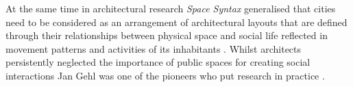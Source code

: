 
At the same time in architectural research \textit{Space Syntax} generalised that cities need to be considered as an arrangement of architectural layouts that are defined through their relationships between physical space and social life reflected in movement patterns and activities of its inhabitants \cite{Hillier_1989}. 
Whilst architects persistently neglected the importance of public spaces for creating social interactions Jan Gehl was one of the pioneers who put research in practice \cite{Gehl_2013}. 








